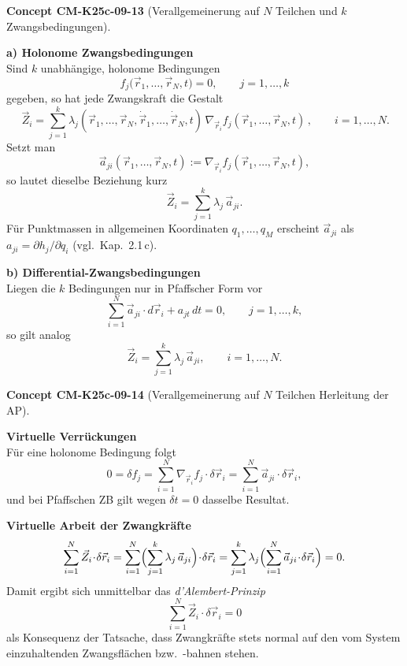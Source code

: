 \documentclass[10pt, letterpaper]{article}
\newcommand{\CustomHeading}[3]{%
  \par\medskip\noindent%
  \textbf{#1 #2} \textnormal{(#3)}.\enskip%
}
\newenvironment{CONC}[2]{\begin{unitbox}\CustomHeading{Concept}{#1}{#2}}{\end{unitbox}}
\begin{document}
\begin{CONC}{CM-K25c-09-13}{Verallgemeinerung auf $N$ Teilchen und $k$ Zwangsbedingungen}
\textbf{a) Holonome Zwangsbedingungen}\\
Sind $k$ unabhängige, holonome Bedingungen
\[
  f_j\!\bigl(\vec r_1,\dots,\vec r_N,t\bigr)=0,
  \qquad j=1,\dots,k
\]
gegeben, so hat jede Zwangskraft die Gestalt
\[
  \boxed{\,%
    \vec Z_i =
    \sum_{j=1}^{k}
      \lambda_j(\vec r_1,\dots,\vec r_N,
                \dot{\vec r}_1,\dots,\dot{\vec r}_N,t)\,
      \nabla_{\!\vec r_i} f_j(\vec r_1,\dots,\vec r_N,t)
    \,}, \qquad i=1,\dots,N.
\]
Setzt man
\[
  \vec a_{ji}(\vec r_1,\dots,\vec r_N,t)
  :=\nabla_{\!\vec r_i} f_j(\vec r_1,\dots,\vec r_N,t),
\]
so lautet dieselbe Beziehung kurz
\[
  \vec Z_i = \sum_{j=1}^{k}\lambda_j\,\vec a_{ji}.
\]
Für Punktmassen in allgemeinen Koordinaten
\(
  q_1,\dots,q_M
\)
erscheint $\vec a_{ji}$ als
\(
  a_{ji}=\partial h_j/\partial q_i
\)
(vgl.\ Kap.~2.1\,c).

\textbf{b) Differential-Zwangsbedingungen}\\
Liegen die $k$ Bedingungen nur in Pfaffscher Form vor
\[
  \sum_{i=1}^{N}\vec a_{ji}\!\cdot d\vec r_i + a_{jt}\,dt = 0,
  \qquad j=1,\dots,k,
\]
so gilt analog
\[
  \boxed{\,%
    \vec Z_i = \sum_{j=1}^{k}\lambda_j\,\vec a_{ji},
    \qquad i=1,\dots,N.%
  \,}
\]
\end{CONC}



\begin{CONC}{CM-K25c-09-14}{Verallgemeinerung auf $N$ Teilchen Herleitung der AP}
\textbf{Virtuelle Verrückungen}\\
Für eine holonome Bedingung folgt
\[
  0 = \delta f_j
    = \sum_{i=1}^{N}\nabla_{\!\vec r_i}f_j\!\cdot\!\delta\vec r_i
    = \sum_{i=1}^{N}\vec a_{ji}\!\cdot\!\delta\vec r_i,
\]
und bei Pfaffschen ZB gilt wegen $\delta t=0$ dasselbe Resultat.

\textbf{Virtuelle Arbeit der Zwangkräfte}\\
\[
  \sum_{i=1}^{N}\vec Z_i\!\cdot\!\delta\vec r_i
  = \sum_{i=1}^{N}
      \Bigl(\sum_{j=1}^{k}\lambda_j\,\vec a_{ji}\Bigr)
      \!\cdot\!\delta\vec r_i
  = \sum_{j=1}^{k}\lambda_j
      \Bigl(\sum_{i=1}^{N}\vec a_{ji}\!\cdot\!\delta\vec r_i\Bigr)
  = 0.
\]
Damit ergibt sich unmittelbar das \emph{d’Alembert-Prinzip}
\[
  \boxed{\;
    \sum_{i=1}^{N}\vec Z_i\!\cdot\!\delta\vec r_i = 0
  \;}
\]
als Konsequenz der Tatsache, dass Zwangkräfte stets normal auf
den vom System einzuhaltenden Zwangsflächen bzw.\ -bahnen stehen.
\end{CONC}
\end{document}
